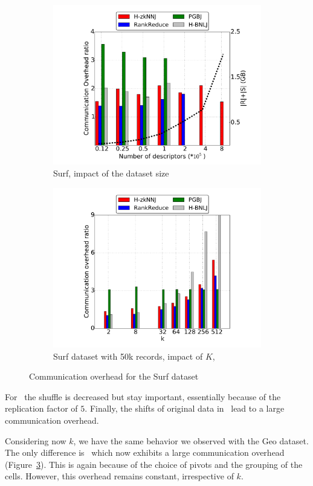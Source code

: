 \begin{figure}[htp]
	\centering
	\begin{subfigure}[b]{0.48\textwidth}
		\includegraphics[width=\textwidth]{img-perf/surf/data/shuffle.pdf}
		\caption{Surf, impact of the dataset size\label{fig:surf_data_shuffle}}        
	\end{subfigure}%
	\begin{subfigure}[b]{0.48\textwidth}
		\includegraphics[width=\textwidth]{img-perf/surf/k/shuffle.pdf} 
		\caption{Surf dataset with 50k records, impact of $K$,\label{fig:surf_k_shuffle}}
	\end{subfigure}%
	\caption{Communication overhead for the Surf dataset}      
\end{figure}


For \LSH~the shuffle is decreased but stay important, essentially because of the replication factor of $5$. Finally,
the shifts of original data in \Z~lead to a large communication overhead. 


Considering now $k$, we have the same behavior we observed with the Geo dataset. The only difference is \VO~which now exhibits a
large communication overhead (Figure~\ref{fig:surf_k_shuffle}). This is again because of the choice of pivots and 
the grouping of the cells. However, this overhead remains constant, irrespective of $k$. 
